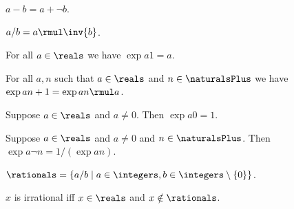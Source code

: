 
\begin{definition}\label{real_sub}
    $a - b = a + \neg{b}$.
\end{definition}

\begin{definition}\label{real_div}
    $a / b = a \rmul \inv{b}$.
\end{definition}


\begin{axiom}\label{real_pow_one}
    For all $a\in\reals$ we have $\exp{a}{1} = a$.
\end{axiom}


\begin{axiom}\label{real_pow_succ}
    For all $a, n$ such that $a\in\reals$ and $n\in\naturalsPlus$ we have $\exp{a}{n+1} = \exp{a}{n} \rmul a$.
\end{axiom}

\begin{axiom}\label{real_pow_zero}
    Suppose $a\in\reals$ and $a\neq 0$.
    Then $\exp{a}{0} = 1$.
\end{axiom}


\begin{axiom}\label{real_pow_neg}
    Suppose $a\in\reals$ and $a\neq 0$ and $n\in\naturalsPlus$.
    Then $\exp{a}{\neg{n}} = 1 / (\exp{a}{n})$. 
\end{axiom}

\begin{definition}\label{real_rationals}
    $\rationals = \{ a / b \mid a\in\integers, b\in\integers\setminus\{0\}\}$.
\end{definition}

\begin{abbreviation}\label{real_irrational}
    $x$ is irrational iff $x\in\reals$ and $x\notin\rationals$.
\end{abbreviation}

